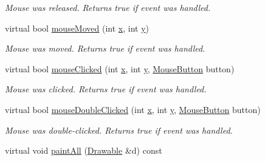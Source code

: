 \begin{DoxyCompactItemize}
\begin{DoxyCompactList}\small\item\em Mouse was released. Returns true if event was handled. \end{DoxyCompactList}\item 
\hypertarget{classGUI_1_1WindowInWindow_af278696e6a9012213d67112aaf1dcfe8}{virtual bool \hyperlink{classGUI_1_1WindowInWindow_af278696e6a9012213d67112aaf1dcfe8}{mouse\-Moved} (int \hyperlink{classGUI_1_1Window_a6ca6a80ca00c9e1d8ceea8d3d99a657d}{x}, int \hyperlink{classGUI_1_1Window_a0ee8e923aff2c3661fc2e17656d37adf}{y})}\label{classGUI_1_1WindowInWindow_af278696e6a9012213d67112aaf1dcfe8}

\begin{DoxyCompactList}\small\item\em Mouse was moved. Returns true if event was handled. \end{DoxyCompactList}\item 
virtual bool \hyperlink{classGUI_1_1WindowInWindow_a2ed086150348b1fcf9564997185b76a4}{mouse\-Clicked} (int \hyperlink{classGUI_1_1Window_a6ca6a80ca00c9e1d8ceea8d3d99a657d}{x}, int \hyperlink{classGUI_1_1Window_a0ee8e923aff2c3661fc2e17656d37adf}{y}, \hyperlink{namespaceGUI_ad06082a7b02aa73697f39eb8e0856de9}{Mouse\-Button} button)
\begin{DoxyCompactList}\small\item\em Mouse was clicked. Returns true if event was handled. \end{DoxyCompactList}\item 
\hypertarget{classGUI_1_1WindowInWindow_ac2c184d3cad01f199019a72963db36c0}{virtual bool \hyperlink{classGUI_1_1WindowInWindow_ac2c184d3cad01f199019a72963db36c0}{mouse\-Double\-Clicked} (int \hyperlink{classGUI_1_1Window_a6ca6a80ca00c9e1d8ceea8d3d99a657d}{x}, int \hyperlink{classGUI_1_1Window_a0ee8e923aff2c3661fc2e17656d37adf}{y}, \hyperlink{namespaceGUI_ad06082a7b02aa73697f39eb8e0856de9}{Mouse\-Button} button)}\label{classGUI_1_1WindowInWindow_ac2c184d3cad01f199019a72963db36c0}

\begin{DoxyCompactList}\small\item\em Mouse was double-\/clicked. Returns true if event was handled. \end{DoxyCompactList}\item 
\hypertarget{classGUI_1_1WindowInWindow_a997195eb95899394daa7c8806dfa6cf7}{virtual void \hyperlink{classGUI_1_1WindowInWindow_a997195eb95899394daa7c8806dfa6cf7}{paint\-All} (\hyperlink{classGUI_1_1Drawable}{Drawable} \&d) const }\label{classGUI_1_1WindowInWindow_a997195eb95899394daa7c8806dfa6cf7}


\end{DoxyCompactItemize}
